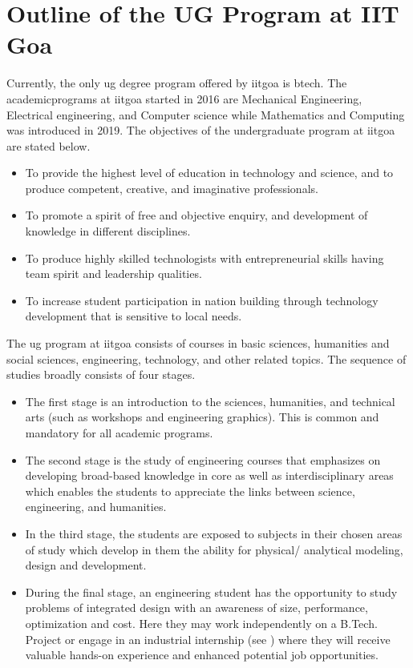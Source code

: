 \section{Outline of the UG Program at IIT Goa}
	
Currently, the only \acrshort{ug} degree program offered by \acrfull{iitgoa} is \acrfull{btech}. The \glspl{academicprogram} at \acrshort{iitgoa} started in 2016 are Mechanical Engineering, Electrical engineering, and Computer science while Mathematics and Computing was introduced in 2019. The objectives of the undergraduate program at \acrshort{iitgoa} are stated below.
	
\begin{itemize}[leftmargin=15mm]
	\item To provide the highest level of education in technology and science, and to produce competent, creative, and imaginative professionals.
	\item To promote a spirit of free and objective enquiry, and development of knowledge in different disciplines. 
	\item To produce highly skilled technologists with entrepreneurial skills having team spirit and leadership qualities. 
	\item To increase \gls{student} participation in nation building through technology development that is sensitive to local needs.
\end{itemize}
	 
The \acrshort{ug} program at \acrshort{iitgoa} consists of courses in basic sciences, humanities and social sciences, engineering, technology, and other related topics. The sequence of studies broadly consists of four stages.
	
\begin{itemize}[leftmargin=15mm]
	\item The first stage is an introduction to the sciences, humanities, and technical arts (such as workshops and engineering graphics). This is common and mandatory for all academic programs. 
	\item The second stage is the study of engineering courses that emphasizes on developing broad-based knowledge in core as well as interdisciplinary areas which enables the \glspl{student} to appreciate the links between science, engineering, and humanities. 
	\item In the third stage, the \glspl{student} are exposed to subjects in their chosen areas of study which develop in them the ability for physical/ analytical modeling, design and development. 
	\item During the final stage, an engineering student has the opportunity to study problems of integrated design with an awareness of size, performance, optimization and cost. Here they may work independently on a B.Tech. Project or engage in an industrial internship (see ) where they will receive valuable hands-on experience and enhanced potential job opportunities.
\end{itemize}

